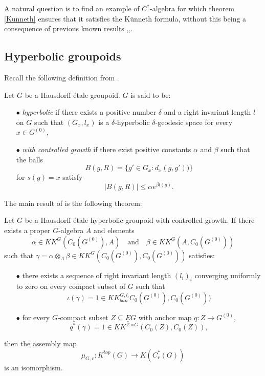 A natural question is to find an example of $C^*$-algebra for which theorem \ref{Kunneth} ensures that it satisfies the Künneth formula, without this being a consequence of previous known results \cite{RosenbergKunneth},\cite{ChabertEOY},\cite{OY4}.\\


\subsection{Hyperbolic groupoids}
Recall the following definition from \cite{LaffOY}.

\begin{definition}\label{hyperbolicLaff}
Let $G$ be a Hausdorff \'etale groupoid. $G$ is said to be:
\begin{itemize}
\item[$\bullet$] \textit{hyperbolic} if there exists a positive number $\delta$ and a right invariant length $l$ on $G$ such that $(G_x, l_x)$ is a $\delta$-hyperbolic $\delta$-geodesic space for every $x\in G^{(0)}$,
\item[$\bullet$] \textit{with controlled growth} if there exist positive constants $\alpha $ and $\beta$ such that the balls 
\[B(g,R) = \{ g' \in G_x : d_x(g,g'))\}\] 
for $s(g)=x$ satisfy \[|B(g,R)| \leq \alpha e^{\beta l(g)}.\]
\end{itemize}
\end{definition}

The main result of \cite{LaffOY} is the following theorem:

\begin{thm}
Let $G$ be a Hausdorff \'etale hyperbolic groupoid with controlled growth. If there exists a proper $G$-algebra $A$ and elements 
\[\alpha \in KK^G(C_0(G^{(0)}) , A) \quad \text{and} \quad \beta\in KK^G(A, C_0(G^{(0)}))\]
such that $\gamma = \alpha \otimes_A \beta\in KK^G(C_0(G^{(0)}),C_0(G^{(0)}))$ satisfies:
\begin{itemize}
\item[$\bullet$] there exists a sequence of right invariant length $(l_i)_i$ converging uniformly to zero on every compact subset of $G$ such that 
\[\iota(\gamma) = 1 \in KK^{G,l_i}_{ban}C_0(G^{(0)}),C_0(G^{(0)}))\] 
\item[$\bullet$] for every $G$-compact subset $Z \subseteq \underline E G$ with anchor map $q: Z \rightarrow G^{(0)}$, 
\[q^*(\gamma) = 1 \in KK^{Z\rtimes G}(C_0(Z),C_0(Z)),\]
\end{itemize}
then the assembly map
\[\mu_{G,r} : K^{top}(G)\rightarrow K(C_r^*(G))\]
is an isomorphism.
\end{thm}

